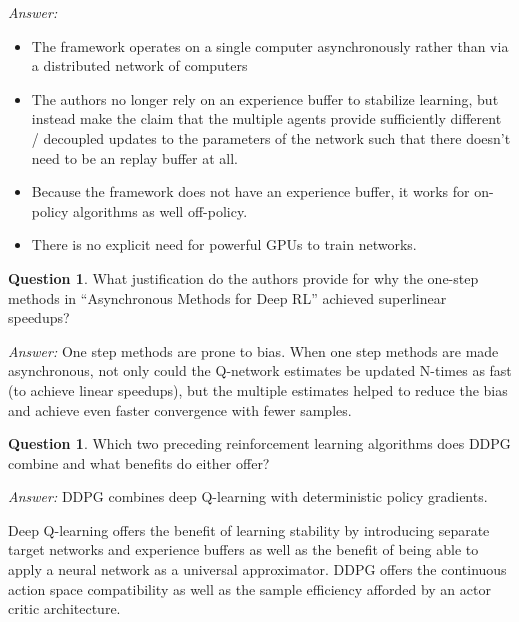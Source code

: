\documentclass{article}
\theoremstyle{definition}
\newtheorem{question}[thm]{Question}
\newenvironment{answer}{\noindent\textit{Answer:}}{}
\begin{document}
\begin{answer}
    \begin{itemize}
        \item The framework operates on a single computer asynchronously rather than via a distributed network of computers
        \item The authors no longer rely on an experience buffer to stabilize learning, but instead make the claim that the multiple agents provide sufficiently different / decoupled updates to the parameters of the network such that there doesn’t need to be an replay buffer at all.
        \item Because the framework does not have an experience buffer, it works for on-policy algorithms as well off-policy. 
        \item There is no explicit need for powerful GPUs to train networks. 
    \end{itemize}    
\end{answer}

\begin{question}
What justification do the authors provide for why the one-step methods in “Asynchronous Methods for Deep RL” achieved superlinear speedups? 
\end{question}

\begin{answer}
One step methods are prone to bias. When one step methods are made asynchronous, not only could the Q-network estimates be updated N-times as fast (to achieve linear speedups), but the multiple estimates helped to reduce the bias and achieve even faster convergence with fewer samples. 
\end{answer}

\begin{question}
Which two preceding reinforcement learning algorithms does DDPG combine and what benefits do either offer?
\end{question}

\begin{answer}
DDPG combines deep Q-learning with deterministic policy gradients.

Deep Q-learning offers the benefit of learning stability by introducing separate target networks and experience buffers as well as the benefit of being able to apply a neural network as a universal approximator. DDPG offers the continuous action space compatibility as well as the sample efficiency afforded by an actor critic architecture.
\end{answer}
\end{document}
